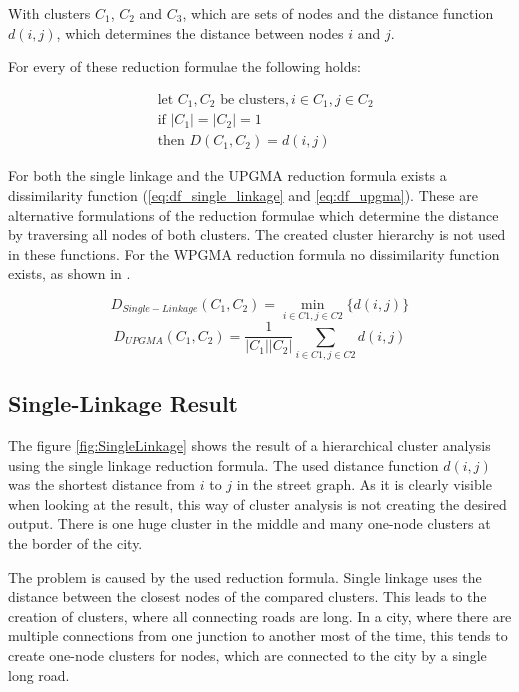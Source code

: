 \documentclass[11pt, a4paper]{report}
\begin{document}
With clusters $C_1$, $C_2$ and $C_3$, which are sets of nodes and the distance function $d(i, j)$, which determines the distance between nodes $i$ and $j$.

For every of these reduction formulae the following holds:

\begin{equation}
\begin{split}
&\textrm{let }C_1, C_2\textrm{ be clusters}, i \in C_1, j \in C_2 \\
&\textrm{if }|C_1| = |C_2| = 1 \\
&\textrm{then }D(C_1, C_2) = d(i, j)
\end{split}
\end{equation}

For both the single linkage and the UPGMA reduction formula exists a dissimilarity function (\ref{eq:df_single_linkage} and \ref{eq:df_upgma}). These are alternative formulations of the reduction formulae which determine the distance by traversing all nodes of both clusters. The created cluster hierarchy is not used in these functions. For the WPGMA reduction formula no dissimilarity function exists, as shown in \cite{clustering:2007}.

\begin{equation} \label{eq:df_single_linkage}
D_{Single-Linkage}(C_1, C_2) = \min_{i\in{C1}, j\in{C2}}\{d(i, j)\}
\end{equation}
\begin{equation} \label{eq:df_upgma}
D_{UPGMA}(C_1, C_2) = \dfrac{1}{|C_1||C_2|} \sum_{i\in{C1}, j\in{C2}}{d(i, j)}
\end{equation}


\subsection{Single-Linkage Result}
The figure \ref{fig:SingleLinkage} shows the result of a hierarchical cluster analysis using the single linkage reduction formula. The used distance function $d(i, j)$ was the shortest distance from $i$ to $j$ in the street graph. As it is clearly visible when looking at the result, this way of cluster analysis is not creating the desired output. There is one huge cluster in the middle and many one-node clusters at the border of the city.

The problem is caused by the used reduction formula. Single linkage uses the distance between the closest nodes of the compared clusters. This leads to the creation of clusters, where all connecting roads are long. In a city, where there are multiple connections from one junction to another most of the time, this tends to create one-node clusters for nodes, which are connected to the city by a single long road.
\end{document}
